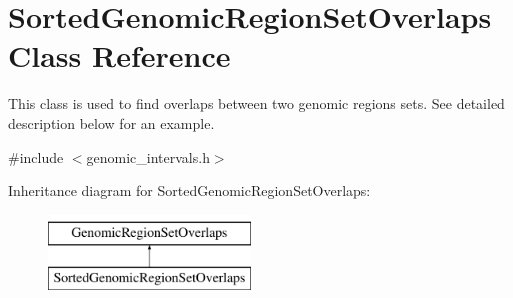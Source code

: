 \hypertarget{classSortedGenomicRegionSetOverlaps}{
\section{SortedGenomicRegionSetOverlaps Class Reference}
\label{classSortedGenomicRegionSetOverlaps}
}


This class is used to find overlaps between two genomic regions sets. See detailed description below for an example.  




{\ttfamily \#include $<$genomic\_\-intervals.h$>$}

Inheritance diagram for SortedGenomicRegionSetOverlaps:\begin{figure}[H]
\begin{center}
\leavevmode
\includegraphics[height=2.000000cm]{classSortedGenomicRegionSetOverlaps}
\end{center}
\end{figure}
